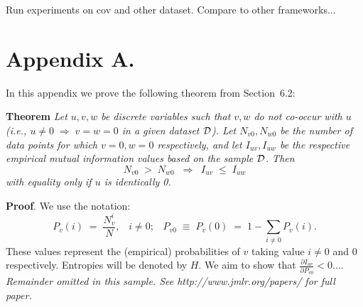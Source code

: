 \documentclass[twoside,11pt]{article}
\newcommand{\dataset}{{\cal D}}
\newcommand{\fracpartial}[2]{\frac{\partial #1}{\partial  #2}}
\newcommand{\0}{\mathbf{0}} %
\begin{document}
Run experiments on cov and other dataset. Compare to other frameworks...




\newpage

\appendix
\section*{Appendix A.}
\label{app:theorem}



In this appendix we prove the following theorem from
Section~6.2:

\noindent
{\bf Theorem} {\it Let $u,v,w$ be discrete variables such that $v, w$ do
not co-occur with $u$ (i.e., $u\neq0\;\Rightarrow \;v=w=0$ in a given
dataset $\dataset$). Let $N_{v0},N_{w0}$ be the number of data points for
which $v=0, w=0$ respectively, and let $I_{uv},I_{uw}$ be the
respective empirical mutual information values based on the sample
$\dataset$. Then
\[
	N_{v0} \;>\; N_{w0}\;\;\Rightarrow\;\;I_{uv} \;\leq\;I_{uw}
\]
with equality only if $u$ is identically 0.} \hfill\BlackBox

\noindent
{\bf Proof}. We use the notation:
\[
P_v(i) \;=\;\frac{N_v^i}{N},\;\;\;i \neq 0;\;\;\;
P_{v0}\;\equiv\;P_v(0)\; = \;1 - \sum_{i\neq 0}P_v(i).
\]
These values represent the (empirical) probabilities of $v$
taking value $i\neq 0$ and 0 respectively.  Entropies will be denoted
by $H$. We aim to show that $\fracpartial{I_{uv}}{P_{v0}} < 0$....\\

{\noindent \em Remainder omitted in this sample. See http://www.jmlr.org/papers/ for full paper.}


\vskip 0.2in

\end{document}
